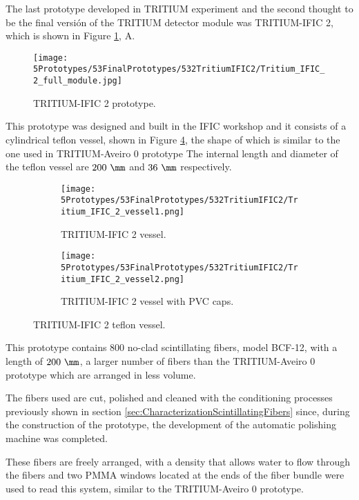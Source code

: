 The last prototype developed in TRITIUM experiment and the second thought to be the final versión of the TRITIUM detector module was TRITIUM-IFIC 2, which is shown in Figure \ref{fig:TritiumIFIC2}, A.

\begin{figure}[h]
\centering
\texttt{[image: 5Prototypes/53FinalPrototypes/532TritiumIFIC2/Tritium\_IFIC\_2\_full\_module.jpg]}
\caption{TRITIUM-IFIC 2 prototype.\label{fig:TritiumIFIC2}}
\end{figure}

This prototype was designed and built in the IFIC workshop and it consists of a cylindrical teflon vessel, shown in Figure \ref{fig:Tritium-IFIC2_vessels}, the shape of which is similar to the one used in TRITIUM-Aveiro 0 prototype The internal length and diameter of the teflon vessel are $200~\mm$ and $36~\mm$ respectively.

\begin{figure}
\centering
    \begin{subfigure}[b]{0.35\textwidth}
    \centering
    \texttt{[image: 5Prototypes/53FinalPrototypes/532TritiumIFIC2/Tritium\_IFIC\_2\_vessel1.png]}  
    \caption{TRITIUM-IFIC 2 vessel.\label{subfig:Tritium_IFIC_2_vessel}}
    \end{subfigure}
    \hfill
    \begin{subfigure}[b]{0.3\textwidth}
    \centering
    \texttt{[image: 5Prototypes/53FinalPrototypes/532TritiumIFIC2/Tritium\_IFIC\_2\_vessel2.png]}  
    \caption{TRITIUM-IFIC 2 vessel with PVC caps.\label{subfig:TritiumIFIC2_vessel_with_PVC_caps}}
    \end{subfigure}
 \caption{TRITIUM-IFIC 2 teflon vessel.}
 \label{fig:Tritium-IFIC2_vessels}
\end{figure}

This prototype contains $800$ no-clad scintillating fibers, model BCF-12, with a length of $200~\mm$, a larger number of fibers than the TRITIUM-Aveiro 0 prototype which are arranged in less volume.

The fibers used are cut, polished and cleaned with the conditioning processes previously shown in section \ref{sec:CharacterizationScintillatingFibers} since, during the construction of the prototype, the development of the automatic polishing machine was completed.

These fibers are freely arranged, with a density that allows water to flow through the fibers and two PMMA windows located at the ends of the fiber bundle were used to read this system, similar to the TRITIUM-Aveiro 0 prototype. 

